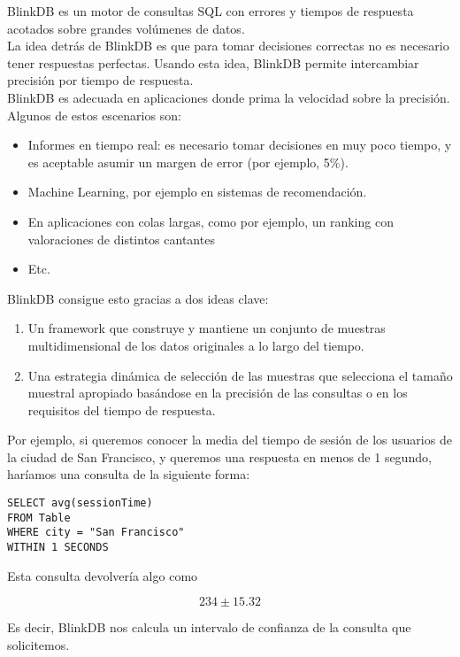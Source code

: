 \documentclass[12pt,a4paper,twoside,openright,titlepage,final]{article}
\begin{document}
BlinkDB es un motor de consultas SQL con errores y tiempos de respuesta acotados sobre grandes volúmenes de datos.\\

La idea detrás de BlinkDB es que para tomar decisiones correctas no es necesario tener respuestas perfectas. Usando esta idea, BlinkDB permite intercambiar precisión por tiempo de respuesta.\\

BlinkDB es adecuada en aplicaciones donde prima la velocidad sobre la precisión. Algunos de estos escenarios son:

\begin{itemize}
\item Informes en tiempo real: es necesario tomar decisiones en muy poco tiempo, y es aceptable asumir un margen de error (por ejemplo, 5\%).
\item Machine Learning, por ejemplo en sistemas de recomendación.
\item En aplicaciones con colas largas, como por ejemplo, un ranking con valoraciones de distintos cantantes
\item Etc.
\end{itemize}

BlinkDB consigue esto gracias a dos ideas clave:

\begin{enumerate}
\item Un framework que construye y mantiene un conjunto de muestras multidimensional de los datos originales a lo largo del tiempo.
\item Una estrategia dinámica de selección de las muestras que selecciona el tamaño muestral apropiado basándose en la precisión de las consultas o en los requisitos del tiempo de respuesta. 
\end{enumerate}

Por ejemplo, si queremos conocer la media del tiempo de sesión de los usuarios de la ciudad de San Francisco, y queremos una respuesta en menos de 1 segundo, haríamos una consulta de la siguiente forma:

\begin{verbatim}
SELECT avg(sessionTime)
FROM Table
WHERE city = "San Francisco"
WITHIN 1 SECONDS
\end{verbatim}

Esta consulta devolvería algo como

\[ 234 \pm 15.32 \]

Es decir, BlinkDB nos calcula un intervalo de confianza de la consulta que solicitemos.\\
\end{document}
